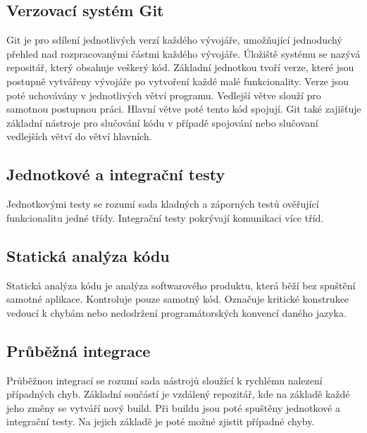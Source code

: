 \documentclass[thesis=B,czech]{FITthesis}[2012/06/26]
\begin{document}
\subsection{Verzovací systém Git}
Git je pro sdílení jednotlivých verzí každého vývojáře, umožňující jednoduchý přehled nad rozpracovanými částmi každého vývojáře.
Úložiště systému se nazývá repositář, který obsahuje veškerý kód.
Základní jednotkou tvoří verze, které jsou postupně vytvářeny vývojáře po vytvoření každé malé funkcionality.
Verze jsou poté uchovávány v jednotlivých větví programu. Vedlejší větve slouží pro samotnou postupnou práci. 
Hlavní větve poté tento kód spojují.
Git také zajišťuje základní nástroje pro slučování kódu v případě spojování nebo slučovaní vedlejších větví do větví hlavních.
\subsection{Jednotkové a integrační testy}
Jednotkovými testy se rozumí sada kladných a záporných testů ověřující funkcionalitu jedné třídy.
Integrační testy pokrývají komunikaci více tříd.
\subsection{Statická analýza kódu}
Statická analýza kódu je analýza softwarového produktu, která běží bez spuštění samotné aplikace. Kontroluje 
pouze samotný kód. Označuje kritické konstrukce vedoucí k chybám nebo nedodržení programátorských konvencí daného
jazyka.
\subsection{Průběžná integrace}
Průběžnou integrací se rozumí sada nástrojů sloužící k rychlému nalezení případných chyb. Základní součástí je vzdálený repozitář, kde na 
základě každé jeho změny se vytváří nový build. Při buildu jsou poté spuštěny jednotkové a integrační testy.
Na jejich základě je poté možné zjistit případné chyby.
\end{document}
